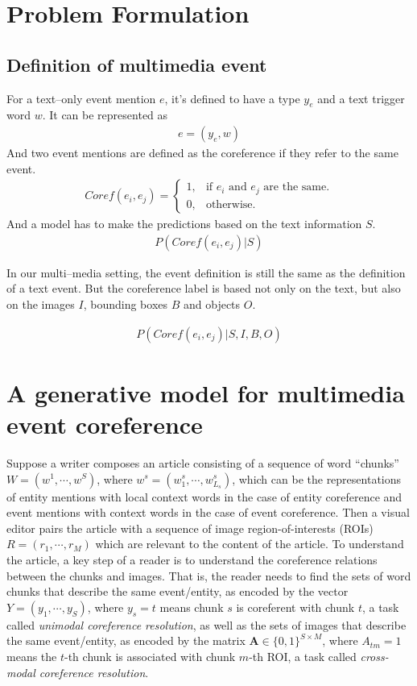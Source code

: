 \documentclass[11pt,a4paper]{article}
\newcommand{\bA}{\mathbf{A}}
\begin{document}
\section{Problem Formulation}
\subsection{Definition of multimedia event}
For a text--only event mention $e$, it's defined to have a type $y_e$ and a text trigger word $w$. It can be represented as 
\begin{align*}
    e = (y_e, w)
\end{align*}
And two event mentions are defined as the coreference if they refer to the same event. 
\begin{align*}
    Coref(e_i,e_j)= \begin{cases}
    1, & \text{if $e_i$ and $e_j$ are the same}.\\
    0, & \text{otherwise}.
    \end{cases}
\end{align*}    
And a model has to make the predictions based on the text information $S$.
\begin{align*}
    P(Coref(e_i,e_j)|S)
\end{align*}

In our multi--media setting, the event definition is still the same as the definition of a text event. But the coreference label is based not only on the text, but also on the images $I$, bounding boxes $B$ and objects $O$. 

\begin{align*}
    P(Coref(e_i,e_j)|S,I,B,O)
\end{align*}

\section{A generative model for multimedia event coreference}
 Suppose a writer composes an article consisting of a sequence of word ``chunks'' $W = (w^1, \cdots, w^S)$, where $w^s = (w^s_1, \cdots, w^s_{L_s})$, which can be the representations of entity mentions with local context words in the case of entity coreference and event mentions with context words in the case of event coreference. Then a visual editor pairs the article with a sequence of image region-of-interests (ROIs) $R = (r_1, \cdots, r_M)$ which are relevant to the content of the article. To understand the article, a key step of a reader is to understand the coreference relations between the chunks and images. That is, the reader needs to find the sets of word chunks that describe the same event/entity, as encoded by the vector $Y = (y_1,\cdots,y_S)$, where $y_s = t$ means chunk $s$ is coreferent with chunk $t$, a task called \textit{unimodal coreference resolution}, as well as the sets of images that describe the same event/entity, as encoded by the matrix $\bA \in \{0, 1\}^{S \times M}$, where $A_{tm}=1$ means the $t$-th chunk is associated with chunk $m$-th ROI, a task called \textit{cross-modal coreference resolution}.  
 
\end{document}
